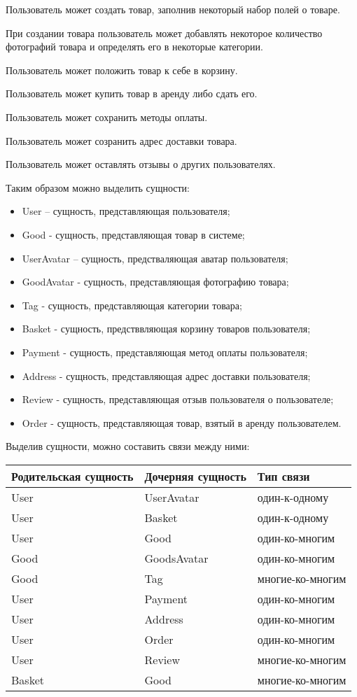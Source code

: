 Пользователь может создать товар, заполнив некоторый набор полей о товаре.

При создании товара пользователь может добавлять некоторое количество фотографий товара и определять его в некоторые категории.

Пользователь может положить товар к себе в корзину.

Пользователь может купить товар в аренду либо сдать его.

Пользователь может сохранить методы оплаты.

Пользователь может созранить адрес доставки товара.

Пользователь может оставлять отзывы о других пользователях.

Таким образом можно выделить сущности:
\begin{itemize}
    \item User – сущность, представляющая пользователя;
    \item Good - сущность, представляющая товар в системе;
    \item UserAvatar – сущность, предстваляющая аватар пользователя;
    \item GoodAvatar - сущность, представляющая фотографию товара;
    \item Tag - сущность, представляющая категории товара;
    \item Basket - сущность, предстввляющая корзину товаров пользователя;
    \item Payment - сущность, представляющая метод оплаты пользователя;
    \item Address - сущность, представляющая адрес доставки пользователя;
    \item Review - сущность, представляющая отзыв пользователя о пользователе;
    \item Order - сущность, представляющая товар, взятый в аренду пользователем.
\end{itemize}

Выделив сущности, можно составить связи между ними:
\bigbreak

\begin{tabular}{ | l | l | l | }
\hline
Родительская сущность & Дочерняя сущность & Тип связи  \\ \hline
User & UserAvatar & один-к-одному \\ \hline
User & Basket & один-к-одному \\ \hline
User & Good & один-ко-многим \\ \hline
Good & GoodsAvatar & один-ко-многим \\ \hline
Good & Tag & многие-ко-многим \\ \hline
User & Payment & один-ко-многим \\ \hline
User & Address & один-ко-многим \\ \hline
User & Order & один-ко-многим \\ \hline
User & Review & многие-ко-многим \\ \hline
Basket & Good & многие-ко-многим \\
\hline
\end{tabular}

